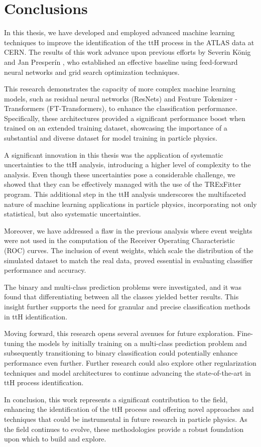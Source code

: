 \chapter{Conclusions}
\label{ch:Conclusions}

In this thesis, we have developed and employed advanced machine learning techniques to improve the identification of the
ttH process in the ATLAS data at CERN. The results of this work advance upon previous efforts by Severin König and Jan
Presperín \cite{severin, jan}, who established an effective baseline using feed-forward neural networks and grid search
optimization techniques.

This research demonstrates the capacity of more complex machine learning models, such as residual neural networks
(ResNets) and Feature Tokenizer - Transformers (FT-Transformers), to enhance the classification performance.
Specifically, these architectures provided a significant performance boost when trained on an extended training dataset,
showcasing the importance of a substantial and diverse dataset for model training in particle physics.

A significant innovation in this thesis was the application of systematic uncertainties to the ttH analysis, introducing
a higher level of complexity to the analysis. Even though these uncertainties pose a considerable challenge, we showed
that they can be effectively managed with the use of the TRExFitter program. This additional step in the ttH analysis
underscores the multifaceted nature of machine learning applications in particle physics, incorporating not only
statistical, but also systematic uncertainties.

Moreover, we have addressed a flaw in the previous analysis where event weights were not used in the computation of the
Receiver Operating Characteristic (ROC) curves. The inclusion of event weights, which scale the distribution of the
simulated dataset to match the real data, proved essential in evaluating classifier performance and accuracy.

The binary and multi-class prediction problems were investigated, and it was found that differentiating between all the
classes yielded better results. This insight further supports the need for granular and precise classification methods
in ttH identification.

Moving forward, this research opens several avenues for future exploration. Fine-tuning the models by initially training
on a multi-class prediction problem and subsequently transitioning to binary classification could potentially enhance
performance even further. Further research could also explore other regularization techniques and model architectures to
continue advancing the state-of-the-art in ttH process identification.

In conclusion, this work represents a significant contribution to the field, enhancing the identification of the ttH
process and offering novel approaches and techniques that could be instrumental in future research in particle physics.
As the field continues to evolve, these methodologies provide a robust foundation upon which to build and explore.